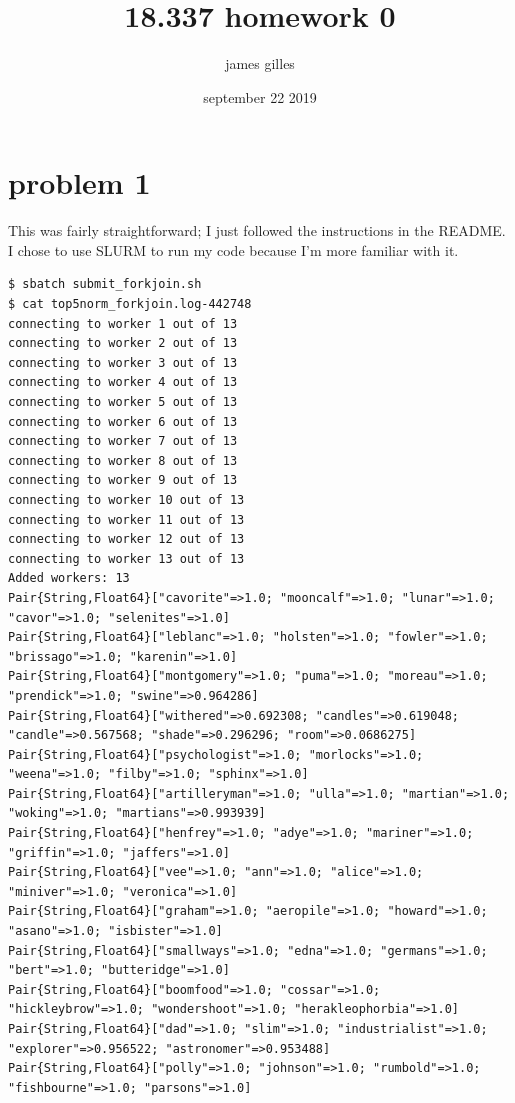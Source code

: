 \documentclass[nobib]{tufte-handout}
\author{james gilles}
\date{september 22 2019}
\title{18.337 homework 0}
\makeatletter
\renewcommand{\maketitle}{%
\begingroup
\setlength{\parindent}{0pt}%
\setlength{\parskip}{4pt}%
\LARGE\scshape\plaintitle\par
\Large\itshape\plainauthor\par
\Large\itshape\thedate\par
\endgroup
}
\makeatother
\begin{document}
\maketitle
\tableofcontents


\section{problem 1}
\label{sec:org6b6b449}

This was fairly straightforward; I just followed the instructions in the README. I chose to use SLURM to run my code because I'm more familiar with it.

\begin{verbatim}
$ sbatch submit_forkjoin.sh
$ cat top5norm_forkjoin.log-442748
connecting to worker 1 out of 13
connecting to worker 2 out of 13
connecting to worker 3 out of 13
connecting to worker 4 out of 13
connecting to worker 5 out of 13
connecting to worker 6 out of 13
connecting to worker 7 out of 13
connecting to worker 8 out of 13
connecting to worker 9 out of 13
connecting to worker 10 out of 13
connecting to worker 11 out of 13
connecting to worker 12 out of 13
connecting to worker 13 out of 13
Added workers: 13
Pair{String,Float64}["cavorite"=>1.0; "mooncalf"=>1.0; "lunar"=>1.0; "cavor"=>1.0; "selenites"=>1.0]
Pair{String,Float64}["leblanc"=>1.0; "holsten"=>1.0; "fowler"=>1.0; "brissago"=>1.0; "karenin"=>1.0]
Pair{String,Float64}["montgomery"=>1.0; "puma"=>1.0; "moreau"=>1.0; "prendick"=>1.0; "swine"=>0.964286]
Pair{String,Float64}["withered"=>0.692308; "candles"=>0.619048; "candle"=>0.567568; "shade"=>0.296296; "room"=>0.0686275]
Pair{String,Float64}["psychologist"=>1.0; "morlocks"=>1.0; "weena"=>1.0; "filby"=>1.0; "sphinx"=>1.0]
Pair{String,Float64}["artilleryman"=>1.0; "ulla"=>1.0; "martian"=>1.0; "woking"=>1.0; "martians"=>0.993939]
Pair{String,Float64}["henfrey"=>1.0; "adye"=>1.0; "mariner"=>1.0; "griffin"=>1.0; "jaffers"=>1.0]
Pair{String,Float64}["vee"=>1.0; "ann"=>1.0; "alice"=>1.0; "miniver"=>1.0; "veronica"=>1.0]
Pair{String,Float64}["graham"=>1.0; "aeropile"=>1.0; "howard"=>1.0; "asano"=>1.0; "isbister"=>1.0]
Pair{String,Float64}["smallways"=>1.0; "edna"=>1.0; "germans"=>1.0; "bert"=>1.0; "butteridge"=>1.0]
Pair{String,Float64}["boomfood"=>1.0; "cossar"=>1.0; "hickleybrow"=>1.0; "wondershoot"=>1.0; "herakleophorbia"=>1.0]
Pair{String,Float64}["dad"=>1.0; "slim"=>1.0; "industrialist"=>1.0; "explorer"=>0.956522; "astronomer"=>0.953488]
Pair{String,Float64}["polly"=>1.0; "johnson"=>1.0; "rumbold"=>1.0; "fishbourne"=>1.0; "parsons"=>1.0]
\end{verbatim}
\end{document}
